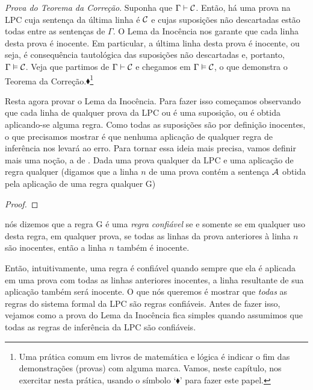 \emph{Prova do Teorema da Correção}. Suponha que $\Gamma \vdash \mathcal{C}$. Então, há uma prova na LPC cuja sentença da última linha é $\mathcal{C}$ e cujas suposições não descartadas estão todas entre as sentenças de $\Gamma$.
O Lema da Inocência nos garante que cada linha desta prova é inocente.
Em particular, a última linha desta prova é inocente, ou seja, é consequência tautológica das suposições não descartadas e, portanto, $\Gamma \vDash \mathcal{C}$.
Veja que partimos de $\Gamma \vdash \mathcal{C}$ e chegamos em $\Gamma \vDash \mathcal{C}$, o que demonstra o Teorema da Correção.$\blacklozenge$\footnote{
	Uma prática comum em livros de matemática e lógica é indicar o fim das demonstrações (provas) com alguma marca. Vamos, neste capítulo, nos exercitar nesta prática, usando o símbolo `$\blacklozenge$' para fazer este papel.}

Resta agora provar o Lema da Inocência.
Para fazer isso começamos observando que cada linha de qualquer prova da LPC ou é uma suposição, ou é obtida aplicando-se alguma regra.
Como todas as suposições são por definição inocentes, o que precisamos mostrar é que nenhuma aplicação de qualquer regra de inferência nos levará ao erro.
Para tornar essa ideia mais precisa, vamos definir mais uma noção, a de .
Dada uma prova qualquer da LPC e uma aplicação de regra qualquer (digamos que a linha $n$ de uma prova contém a sentença $\mathcal{A}$ obtida pela aplicação de uma regra qualquer G)
		   \begin{proof}
		   \end{proof}	   
nós dizemos que a regra G é uma \emph{regra confiável} se e somente se em qualquer uso desta regra, em qualquer prova, se todas as linhas da prova anteriores à linha $n$ são inocentes, então a linha $n$ também é inocente.

Então, intuitivamente, uma regra é confiável quando sempre que ela é aplicada em uma prova com todas as linhas anteriores inocentes, a linha resultante de sua aplicação também será inocente.
O que nós queremos é mostrar que \emph{todas} as regras do sistema formal da LPC são regras confiáveis.
Antes de fazer isso, vejamos como a prova do Lema da Inocência fica simples quando assumimos que todas as regras de inferência da LPC são confiáveis.
	
